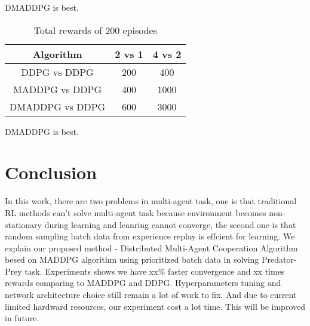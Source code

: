 \documentclass[11pt,twocolumn]{jarticle} %
\begin{document}
DMADDPG is best.

\begin{table}[ht]
 \caption{Total rewards of 200 episodes} 
 \label{tbl:reward}
  \begin{center}
    \begin{tabular}{|c|c|c|}
    \hline
    Algorithm  & 2 vs 1 & 4 vs 2 \\
    \hline \hline
    DDPG vs DDPG     & 200 & 400  \\\hline
    MADDPG vs DDPG   & 400 & 1000 \\\hline
    DMADDPG vs DDPG  & 600 & 3000 \\\hline
    \end{tabular}
  \end{center}
\end{table}
DMADDPG is best.

\section{Conclusion}
In this work, there are two problems in multi-agent task, one is that traditional RL methods can't solve multi-agent task because environment becomes non-stationary during learning and leanring cannot converge, the second one is that random sampling batch data from experience replay is effcient for learning. We explain our proposed method - Distributed Multi-Agent Cooperation Algorithm besed on MADDPG algorithm using prioritized batch data in solving Predator-Prey task. Experiments shows we have xx\% faster convergence and xx times rewards comparing to MADDPG and DDPG.
Hyperparameters tuning and network architecture choice still remain a lot of work to fix.
And due to current limited hardward resources, our experiment cost a lot time. This will be improved in future.
\end{document}
